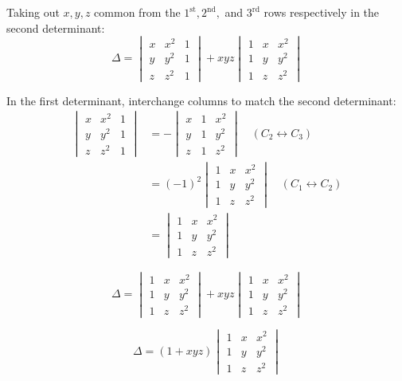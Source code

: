 \begin{enumerate}[label=\thesubsection.\arabic*, ref=\thesubsection.\theenumi]
Taking out $x, y, z$ common from the $1^{\text{st}}, 2^{\text{nd}},$ and $3^{\text{rd}}$ rows respectively in the second determinant:
$$\Delta = \begin{vmatrix} x & x^2 & 1 \\ y & y^2 & 1 \\ z & z^2 & 1 \end{vmatrix} + xyz \begin{vmatrix} 1 & x & x^2 \\ 1 & y & y^2 \\ 1 & z & z^2 \end{vmatrix}$$

In the first determinant, interchange columns to match the second determinant:
\begin{align*}
\begin{vmatrix} x & x^2 & 1 \\ y & y^2 & 1 \\ z & z^2 & 1 \end{vmatrix} &= -\begin{vmatrix} x & 1 & x^2 \\ y & 1 & y^2 \\ z & 1 & z^2 \end{vmatrix} \quad (C_2 \leftrightarrow C_3) \\
&= (-1)^2 \begin{vmatrix} 1 & x & x^2 \\ 1 & y & y^2 \\ 1 & z & z^2 \end{vmatrix} \quad (C_1 \leftrightarrow C_2) \\
&= \begin{vmatrix} 1 & x & x^2 \\ 1 & y & y^2 \\ 1 & z & z^2 \end{vmatrix}
\end{align*}

$$\Delta = \begin{vmatrix} 1 & x & x^2 \\ 1 & y & y^2 \\ 1 & z & z^2 \end{vmatrix} + xyz \begin{vmatrix} 1 & x & x^2 \\ 1 & y & y^2 \\ 1 & z & z^2 \end{vmatrix}$$

$$\Delta = (1 + xyz) \begin{vmatrix} 1 & x & x^2 \\ 1 & y & y^2 \\ 1 & z & z^2 \end{vmatrix}$$


\end{enumerate}
